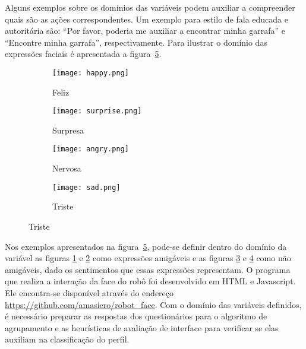 Alguns exemplos sobre os domínios das variáveis podem auxiliar a compreender quais são as ações correspondentes. Um exemplo para estilo de fala educada e autoritária são: ``Por favor, poderia me auxiliar a encontrar minha garrafa'' e ``Encontre minha garrafa'', respectivamente. Para ilustrar o domínio das expressões faciais é apresentada a figura~\ref{fig:dominioexpressoesfaciais}.

\begin{figure}[ht!]
	\centering
	\begin{minipage}{\textwidth}
		\caption{Exemplos das faces apresentadas pelo robô.}
		\begin{subfigure}[b]{0.48\textwidth}
			\texttt{[image: happy.png]}
	        \caption{Feliz}
	        \label{fig:feliz}
	    \end{subfigure}
	    \hfill
		\begin{subfigure}[b]{0.48\textwidth}
	        \texttt{[image: surprise.png]}
	        \caption{Surpresa}
	        \label{fig:surpresa}
	    \end{subfigure}

		\begin{subfigure}[b]{0.48\textwidth}
	        \texttt{[image: angry.png]}
	        \caption{Nervosa}
	        \label{fig:nervosa}
    	\end{subfigure}
		\hfill
		\begin{subfigure}[b]{0.48\textwidth}
	        \texttt{[image: sad.png]}
	        \caption{Triste}
	        \label{fig:triste}
    	\end{subfigure}
		\label{fig:dominioexpressoesfaciais}
	\end{minipage}
\end{figure}

Nos exemplos apresentados na figura~\ref{fig:dominioexpressoesfaciais}, pode-se definir dentro do domínio da variável as figuras \ref{fig:feliz} e \ref{fig:surpresa} como expressões amigáveis e as figuras \ref{fig:nervosa} e \ref{fig:triste} como não amigáveis, dado os sentimentos que essas expressões representam. O programa que realiza a interação da face do robô foi desenvolvido em HTML e Javascript. Ele encontra-se disponível através do endereço \url{https://github.com/amasiero/robot_face}. Com o domínio das variáveis definidos, é necessário preparar as respostas dos questionários para o algoritmo de agrupamento e as heurísticas de avaliação de interface para verificar se elas auxiliam na classificação do perfil.

